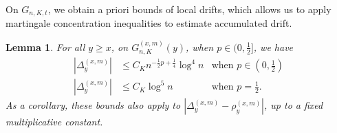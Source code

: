 \documentclass[twoside,12pt, a4paper]{article}
\newtheorem{lemma}{Lemma}[section]
\numberwithin{equation}{section}
\theoremstyle{remark}
\begin{document}
	On $G_{n, K, t}$, we obtain a priori bounds of local drifts, which allows us to apply martingale concentration inequalities to estimate accumulated drift.
	\begin{lemma}\label{lm:lipchitz-bound-on-good-event}
		For all  $y \ge x$, on $G_{n, K}^{(x,m)}(y)$, when $p \in (0,\frac{1}{2}]$,  we have
		\begin{align*}
			\left| \Delta_y^{(x,m)} \right| &\le C_K n^{-\frac{1}{2}p + \frac{1}{4}} \log^4 n &\text{when }p \in \left(0,\frac{1}{2}\right)\\
			\left| \Delta_y^{(x,m)} \right| &\le C_K \log^5 n &\text{when }p = \frac{1}{2}
			.\end{align*}
		As a corollary, these bounds also apply to $\left| \Delta_y^{(x,m)} - \rho_y^{(x,m)} \right| $, up to a fixed multiplicative constant.
	\end{lemma}
\end{document}
